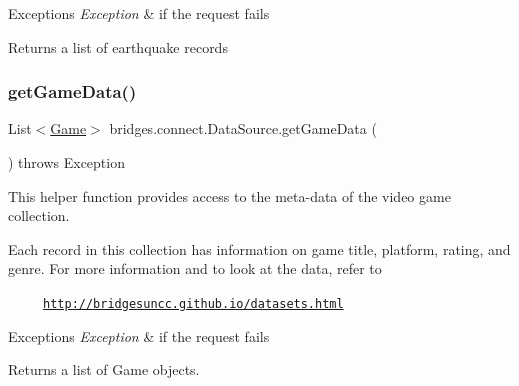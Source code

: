 \begin{DoxyExceptions}{Exceptions}
{\em Exception} & if the request fails\\
\hline
\end{DoxyExceptions}
\begin{DoxyReturn}{Returns}
a list of earthquake records 
\end{DoxyReturn}
\mbox{\label{classbridges_1_1connect_1_1_data_source_ab3744c6b103281724bdd832da0924312}} 
\subsubsection{\texorpdfstring{get\+Game\+Data()}{getGameData()}}
{\footnotesize\ttfamily List$<$\hyperlink{classbridges_1_1data__src__dependent_1_1_game}{Game}$>$ bridges.\+connect.\+Data\+Source.\+get\+Game\+Data (\begin{DoxyParamCaption}{ }\end{DoxyParamCaption}) throws Exception}

This helper function provides access to the meta-\/data of the video game collection.

Each record in this collection has information on game title, platform, rating, and genre. For more information and to look at the data, refer to 

~~~~~\href{http://bridgesuncc.github.io/datasets.html}{\tt http\+://bridgesuncc.\+github.\+io/datasets.\+html} 


\begin{DoxyExceptions}{Exceptions}
{\em Exception} & if the request fails\\
\hline
\end{DoxyExceptions}
\begin{DoxyReturn}{Returns}
a list of Game objects. 
\end{DoxyReturn}
\mbox{\label{classbridges_1_1connect_1_1_data_source_aff3adc9d08624062469315f2fe059044}} 
